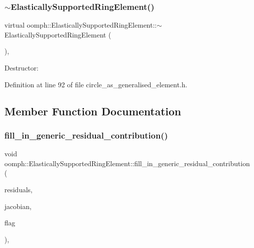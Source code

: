 \subsubsection{\texorpdfstring{$\sim$\+Elastically\+Supported\+Ring\+Element()}{~ElasticallySupportedRingElement()}}
{\footnotesize\ttfamily virtual oomph\+::\+Elastically\+Supported\+Ring\+Element\+::$\sim$\+Elastically\+Supported\+Ring\+Element (\begin{DoxyParamCaption}{ }\end{DoxyParamCaption})\hspace{0.3cm}{\ttfamily [inline]}, {\ttfamily [virtual]}}



Destructor\+: 



Definition at line 92 of file circle\+\_\+as\+\_\+generalised\+\_\+element.\+h.



\subsection{Member Function Documentation}
\mbox{\label{classoomph_1_1ElasticallySupportedRingElement_a6d763f2ce0c930e7a2201e995290f169}} 
\subsubsection{\texorpdfstring{fill\+\_\+in\+\_\+generic\+\_\+residual\+\_\+contribution()}{fill\_in\_generic\_residual\_contribution()}}
{\footnotesize\ttfamily void oomph\+::\+Elastically\+Supported\+Ring\+Element\+::fill\+\_\+in\+\_\+generic\+\_\+residual\+\_\+contribution (\begin{DoxyParamCaption}\item[{Vector$<$ double $>$ \&}]{residuals,  }\item[{Dense\+Matrix$<$ double $>$ \&}]{jacobian,  }\item[{unsigned}]{flag }\end{DoxyParamCaption})\hspace{0.3cm}{\ttfamily [inline]}, {\ttfamily [protected]}}



